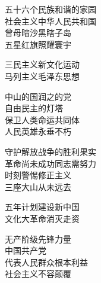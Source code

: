 


\center


五十六个民族和谐的家园\\
社会主义中华人民共和国\\
曾母暗沙黑瞎子岛\\
五星红旗照耀寰宇

三民主义新文化运动\\
马列主义毛泽东思想

中山的国润之的党\\
自由民主的灯塔\\
保卫人类命运共同体\\
人民英雄永垂不朽

守护解放战争的胜利果实\\
革命尚未成功同志需努力\\
时刻警惕修正主义\\
三座大山从未远去

五年计划建设新中国\\
文化大革命消灭走资

无产阶级先锋力量\\
中国共产党\\
代表人民群众根本利益\\
社会主义不容颠覆

